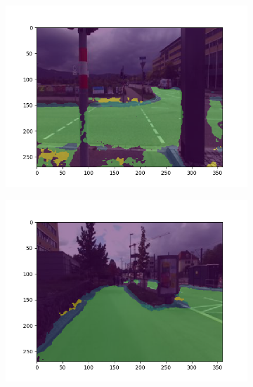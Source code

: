 \begin{figure}
	\begin{subfigure}{.45\textwidth}
		\centering
		\includegraphics[width=\linewidth]{figures/experiments/results-obelix/3.png}
		\caption[Obelix Segmentation Result 3]{}
		\label{fig:obresult-3}
	\end{subfigure}
	\hfill
	\begin{subfigure}{.45\textwidth}
		\centering
		\includegraphics[width=\linewidth]{figures/experiments/results-obelix/4.png}
		\caption[Obelix Segmentation Result 4]{}
		\label{fig:obresult-4}
	\end{subfigure}

	\vspace{12pt}%
	

\end{figure}
